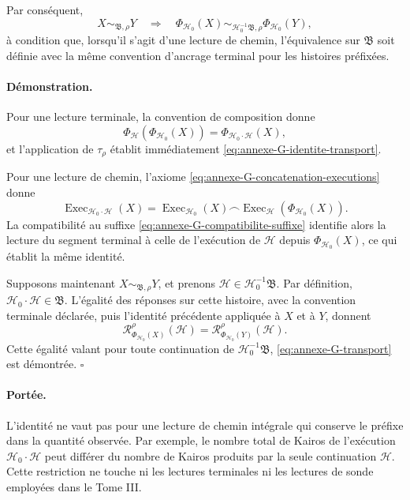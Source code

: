 Par conséquent,
\begin{equation}
\label{eq:annexe-G-transport}
X\sim_{\mathfrak B,\rho}Y
\quad\Longrightarrow\quad
\Phi_{\mathcal H_0}(X)
\sim_{\mathcal H_0^{-1}\mathfrak B,\rho}
\Phi_{\mathcal H_0}(Y),
\end{equation}
à condition que, lorsqu'il s'agit d'une lecture de chemin,
l'équivalence sur \(\mathfrak B\) soit définie avec la même convention
d'ancrage terminal pour les histoires préfixées.

\paragraph{Démonstration.}
Pour une lecture terminale, la convention de composition donne
\[
\Phi_{\mathcal H}(\Phi_{\mathcal H_0}(X))
=
\Phi_{\mathcal H_0\cdot\mathcal H}(X),
\]
et l'application de \(\tau_\rho\) établit immédiatement
\eqref{eq:annexe-G-identite-transport}.

Pour une lecture de chemin, l'axiome
\eqref{eq:annexe-G-concatenation-executions} donne
\[
\operatorname{Exec}_{\mathcal H_0\cdot\mathcal H}(X)
=
\operatorname{Exec}_{\mathcal H_0}(X)
\frown
\operatorname{Exec}_{\mathcal H}
\!\left(\Phi_{\mathcal H_0}(X)\right).
\]
La compatibilité au suffixe
\eqref{eq:annexe-G-compatibilite-suffixe} identifie alors la lecture du
segment terminal à celle de l'exécution de \(\mathcal H\) depuis
\(\Phi_{\mathcal H_0}(X)\), ce qui établit la même identité.

Supposons maintenant \(X\sim_{\mathfrak B,\rho}Y\), et prenons
\(\mathcal H\in\mathcal H_0^{-1}\mathfrak B\). Par définition,
\(\mathcal H_0\cdot\mathcal H\in\mathfrak B\). L'égalité des réponses
sur cette histoire, avec la convention terminale déclarée, puis
l'identité précédente appliquée à \(X\) et à \(Y\), donnent
\[
\mathcal R_{\Phi_{\mathcal H_0}(X)}^\rho(\mathcal H)
=
\mathcal R_{\Phi_{\mathcal H_0}(Y)}^\rho(\mathcal H).
\]
Cette égalité valant pour toute continuation de
\(\mathcal H_0^{-1}\mathfrak B\),
\eqref{eq:annexe-G-transport} est démontrée.
\hfill\(\square\)

\paragraph{Portée.}
L'identité ne vaut pas pour une lecture de chemin intégrale qui conserve
le préfixe dans la quantité observée. Par exemple, le nombre total de
Kairos de l'exécution \(\mathcal H_0\cdot\mathcal H\) peut différer du
nombre de Kairos produits par la seule continuation \(\mathcal H\).
Cette restriction ne touche ni les lectures terminales ni les lectures
de sonde employées dans le Tome III.

